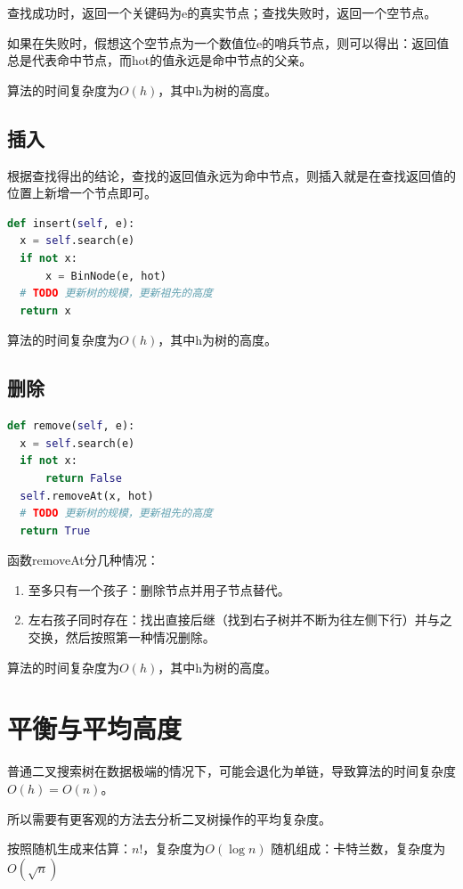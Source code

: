 \documentclass{article}
\begin{document}
查找成功时，返回一个关键码为e的真实节点；查找失败时，返回一个空节点。

如果在失败时，假想这个空节点为一个数值位e的哨兵节点，则可以得出：返回值总是代表命中节点，而hot的值永远是命中节点的父亲。

算法的时间复杂度为$O(h)$，其中h为树的高度。

\subsection{插入}

根据查找得出的结论，查找的返回值永远为命中节点，则插入就是在查找返回值的位置上新增一个节点即可。
\begin{lstlisting}[language=Python]
def insert(self, e):
  x = self.search(e)
  if not x:
      x = BinNode(e, hot)
  # TODO 更新树的规模，更新祖先的高度
  return x
\end{lstlisting}

算法的时间复杂度为$O(h)$，其中h为树的高度。

\subsection{删除}

\begin{lstlisting}[language=Python]
def remove(self, e):
  x = self.search(e)
  if not x:
      return False
  self.removeAt(x, hot)
  # TODO 更新树的规模，更新祖先的高度
  return True
\end{lstlisting}

函数removeAt分几种情况：
\begin{enumerate}
  \item 至多只有一个孩子：删除节点并用子节点替代。
  \item 左右孩子同时存在：找出直接后继（找到右子树并不断为往左侧下行）并与之交换，然后按照第一种情况删除。
\end{enumerate}

算法的时间复杂度为$O(h)$，其中h为树的高度。

\section{平衡与平均高度}
普通二叉搜索树在数据极端的情况下，可能会退化为单链，导致算法的时间复杂度$O(h) = O(n)$。

所以需要有更客观的方法去分析二叉树操作的平均复杂度。

按照随机生成来估算：$n!$，复杂度为$O(\log n)$
随机组成：卡特兰数，复杂度为$O(\sqrt{n})$
\end{document}
